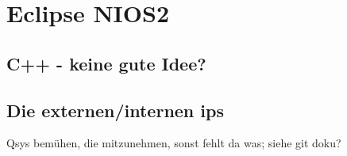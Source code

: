 \chapter{Eclipse NIOS2}
\section{C++ - keine gute Idee?}
\section{Die externen/internen ips}
Qsys bemühen, die mitzunehmen, sonst fehlt da was; siehe git doku?

